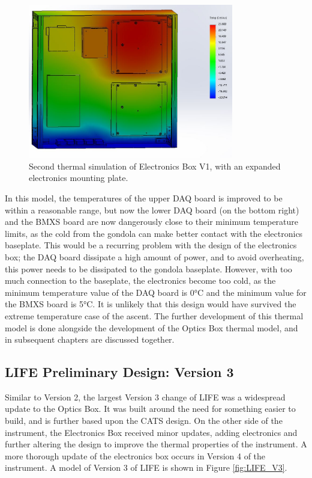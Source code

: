 \begin{figure}
    \centering
    \includegraphics[width=0.8\textwidth]{chap3_images/LIFE_V2_images/TA_-20_expanded_centre_plate.JPG}
    \caption{Second thermal simulation of Electronics Box V1, with an expanded electronics mounting plate.}
    \label{fig:EBOX_V1_TA_2_BIGGERCENTRE}
\end{figure}

In this model, the temperatures of the upper DAQ board is improved to be within a reasonable range, but now the lower DAQ board (on the bottom right) and the BMXS board are now dangerously close to their minimum temperature limits, as the cold from the gondola can make better contact with the electronics baseplate. This would be a recurring problem with the design of the electronics box; the DAQ board dissipate a high amount of power, and to avoid overheating, this power needs to be dissipated to the gondola baseplate. However, with too much connection to the baseplate, the electronics become too cold, as the minimum temperature value of the DAQ board is 0°C and the minimum value for the BMXS board is 5°C. It is unlikely that this design would have survived the extreme temperature case of the ascent. The further development of this thermal model is done alongside the development of the Optics Box thermal model, and in subsequent chapters are discussed together. 

\subsection{LIFE Preliminary Design: Version 3}

Similar to Version 2, the largest Version 3 change of LIFE was a widespread update to the Optics Box. It was built around the need for something easier to build, and is further based upon the CATS design. On the other side of the instrument, the Electronics Box received minor updates, adding electronics and further altering the design to improve the thermal properties of the instrument. A more thorough update of the electronics box occurs in Version 4 of the instrument. A model of Version 3 of LIFE is shown in Figure \ref{fig:LIFE_V3}.

